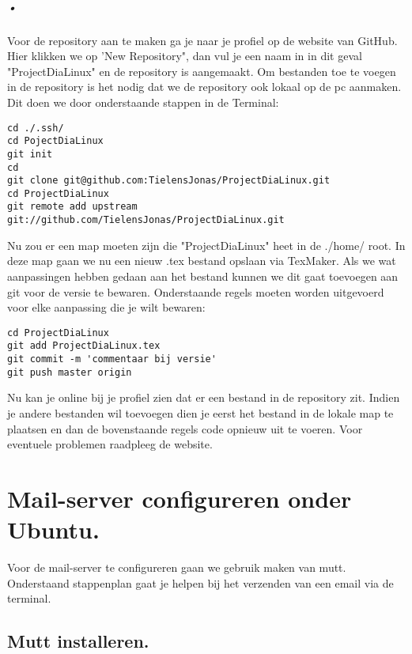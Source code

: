 \documentclass[11pt]{report}
\begin{document}
\paragraph{•}
Voor de repository aan te maken ga je naar je profiel op de website van GitHub. Hier klikken we op 'New Repository", dan vul je een naam in in dit geval "ProjectDiaLinux" en de repository is aangemaakt.
Om bestanden toe te voegen in de repository is het nodig dat we de repository ook lokaal op de pc aanmaken. Dit doen we door onderstaande stappen in de Terminal:
\begin{lstlisting}
cd ./.ssh/
cd PojectDiaLinux
git init
cd
git clone git@github.com:TielensJonas/ProjectDiaLinux.git
cd ProjectDiaLinux
git remote add upstream git://github.com/TielensJonas/ProjectDiaLinux.git
\end{lstlisting}
Nu zou er een map moeten zijn die "ProjectDiaLinux" heet in de ./home/ root. In deze map gaan we nu een nieuw .tex bestand opslaan via TexMaker.
Als we wat aanpassingen hebben gedaan aan het bestand kunnen we dit gaat toevoegen aan git voor de versie te bewaren. 
Onderstaande regels moeten worden uitgevoerd voor elke aanpassing die je wilt bewaren:
\begin{lstlisting}
cd ProjectDiaLinux
git add ProjectDiaLinux.tex
git commit -m 'commentaar bij versie'
git push master origin
\end{lstlisting}
Nu kan je online bij je profiel zien dat er een bestand in de repository zit. Indien je andere bestanden wil toevoegen dien je eerst het bestand in de lokale map te plaatsen en dan de bovenstaande regels code opnieuw uit te voeren.
Voor eventuele problemen raadpleeg de website.
\newpage
\renewcommand{\appendixname}{Bijlage}
\chapter{Mail-server configureren onder Ubuntu.}
Voor de mail-server te configureren gaan we gebruik maken van mutt. Onderstaand stappenplan gaat je helpen bij het verzenden van een email via de terminal.
\section{Mutt installeren.}
\end{document}
